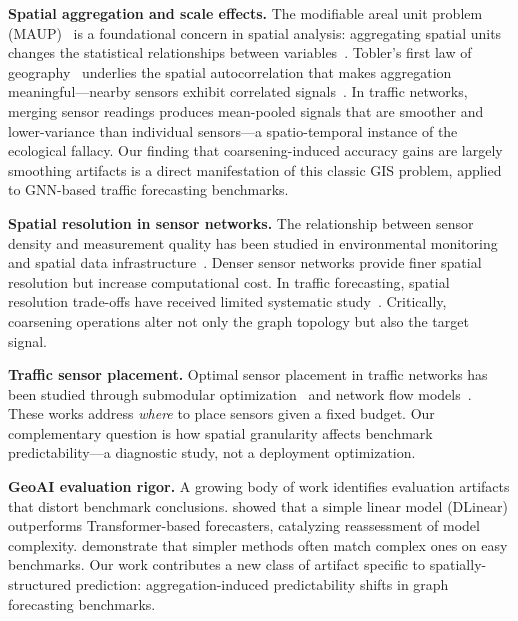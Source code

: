 \documentclass[sigconf]{acmart}
\begin{document}
\textbf{Spatial aggregation and scale effects.} The modifiable areal unit problem (MAUP)~\cite{openshaw1984ecological,robinson1950ecological} is a foundational concern in spatial analysis: aggregating spatial units changes the statistical relationships between variables~\cite{fotheringham1991modifiable,jelinski1996modifiable}. Tobler's first law of geography~\cite{tobler1970computer} underlies the spatial autocorrelation that makes aggregation meaningful---nearby sensors exhibit correlated signals~\cite{anselind1995local}. In traffic networks, merging sensor readings produces mean-pooled signals that are smoother and lower-variance than individual sensors---a spatio-temporal instance of the ecological fallacy. Our finding that coarsening-induced accuracy gains are largely smoothing artifacts is a direct manifestation of this classic GIS problem, applied to GNN-based traffic forecasting benchmarks.

\textbf{Spatial resolution in sensor networks.} The relationship between sensor density and measurement quality has been studied in environmental monitoring~\cite{atkinson2000issues} and spatial data infrastructure~\cite{goodchild2010twenty}. Denser sensor networks provide finer spatial resolution but increase computational cost. In traffic forecasting, spatial resolution trade-offs have received limited systematic study~\cite{aldwyish2021multi}. Critically, coarsening operations alter not only the graph topology but also the target signal.

\textbf{Traffic sensor placement.} Optimal sensor placement in traffic networks has been studied through submodular optimization~\cite{krause2008robust,krause2005nonmyopic} and network flow models~\cite{gentili2008locating,gentili2012review}. These works address \textit{where} to place sensors given a fixed budget. Our complementary question is how spatial granularity affects benchmark predictability---a diagnostic study, not a deployment optimization.

\textbf{GeoAI evaluation rigor.} A growing body of work identifies evaluation artifacts that distort benchmark conclusions. \citet{zeng2023transformers} showed that a simple linear model (DLinear) outperforms Transformer-based forecasters, catalyzing reassessment of model complexity. \citet{makridakis2018statistical} demonstrate that simpler methods often match complex ones on easy benchmarks. Our work contributes a new class of artifact specific to spatially-structured prediction: aggregation-induced predictability shifts in graph forecasting benchmarks.
\end{document}
